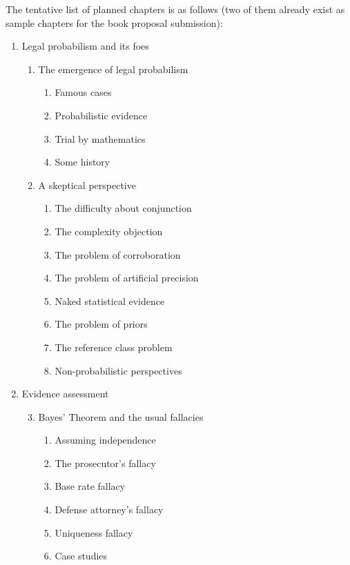 \documentclass[11pt,dvipsnames,enabledeprecatedfontcommands]{scrartcl}
\begin{document}
\pagebreak 

The tentative list of planned chapters is as follows (two of them
already exist as sample chapters for the book proposal submission):

\renewcommand{\labelenumi}{\Roman{enumi}}
\renewcommand{\labelenumii}{\arabic{enumii}}
\renewcommand{\labelenumiii}{\arabic{enumii}.\arabic{enumiii}}

\begin{multicols}{2}
\footnotesize
\begin{enumerate}
\item Legal probabilism and its foes
\begin{enumerate}

  \item The emergence of legal probabilism
  \begin{enumerate}
  \item  Famous cases
  \item  Probabilistic evidence
  \item  Trial by mathematics
  \item  Some history
  \end{enumerate}

  \item  A skeptical perspective
  \begin{enumerate}
  \item The difficulty about conjunction
  \item The complexity objection
  \item  The problem of corroboration
  \item  The problem of artificial precision
  \item Naked statistical evidence
  \item  The problem of priors
  \item  The reference class problem
  \item  Non-probabilistic perspectives
  \end{enumerate}


\end{enumerate}
\item  Evidence assessment
\begin{enumerate}


\setcounter{enumii}{2}
  \item  Bayes' Theorem and the usual fallacies
  \begin{enumerate}
  \item  Assuming independence
  \item  The prosecutor's fallacy
  \item  Base rate fallacy
  \item  Defense attorney's fallacy
  \item  Uniqueness fallacy
  \item  Case studies
  \end{enumerate}


\end{enumerate}
\end{enumerate}
\end{multicols}
\end{document}

